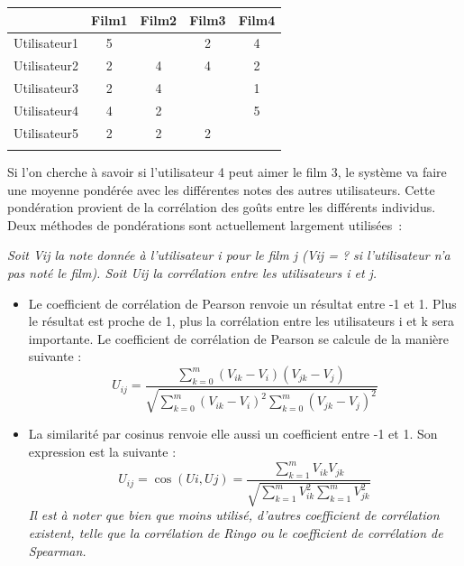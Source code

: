 \documentclass{article}
\begin{document}
\begin{longtable}[c]{lcccc}
     & \multicolumn{1}{l}{Film1} & \multicolumn{1}{l}{Film2} & \multicolumn{1}{l}{Film3} & \multicolumn{1}{l}{Film4} \\ \cline{2-5} 
\endhead
%
\multicolumn{1}{l|}{Utilisateur1} & \multicolumn{1}{c|}{5}    & \multicolumn{1}{c|}{}     & \multicolumn{1}{c|}{2}    & \multicolumn{1}{c|}{4}    \\ \cline{2-5} 
\multicolumn{1}{l|}{Utilisateur2} & \multicolumn{1}{c|}{2}    & \multicolumn{1}{c|}{4}    & \multicolumn{1}{c|}{4}    & \multicolumn{1}{c|}{2}    \\ \cline{2-5} 
\multicolumn{1}{l|}{Utilisateur3} & \multicolumn{1}{c|}{2}    & \multicolumn{1}{c|}{4}    & \multicolumn{1}{c|}{}     & \multicolumn{1}{c|}{1}    \\ \cline{2-5} 
\multicolumn{1}{l|}{Utilisateur4} & \multicolumn{1}{c|}{4}    & \multicolumn{1}{c|}{2}  & \multicolumn{1}{c|}{}     & \multicolumn{1}{c|}{5}    \\ \cline{2-5} 
\multicolumn{1}{l|}{Utilisateur5} & \multicolumn{1}{c|}{2}    & \multicolumn{1}{c|}{2}    & \multicolumn{1}{c|}{2}    & \multicolumn{1}{c|}{}     \\ \cline{2-5} 

\label{my-label3}\\
\end{longtable}

Si l'on cherche à savoir si l'utilisateur 4 peut aimer le film 3, le système va faire une moyenne pondérée avec les différentes notes des autres utilisateurs. Cette pondération provient de la corrélation des goûts entre les différents individus.
Deux méthodes de pondérations sont actuellement largement utilisées~:

\emph{Soit Vij la note donnée à l'utilisateur i pour le film j (Vij = ? si l'utilisateur n'a pas noté le film). Soit Uij la corrélation entre les utilisateurs i et j.}
\begin{itemize}
    \item Le coefficient de corrélation de Pearson renvoie un résultat entre -1 et 1. Plus le résultat est proche de 1, plus la corrélation entre les utilisateurs i et k sera importante. Le coefficient de corrélation de Pearson se calcule de la manière suivante :
    \begin{equation}
        U_{ij} = \frac{\sum_{k=0} ^m (V_{ik}-V_{i})(V_{jk}-V_{j})}{\sqrt{\sum_{k=0}^m (V_{ik}-V_{i})^2 \sum_{k=0}^m (V_{jk}-V_{j})^2 }}
    \end{equation}
    
    \item La similarité par cosinus renvoie elle aussi un coefficient entre -1 et 1. Son expression est la suivante :
    \begin{equation}
        U_{ij} = \cos(Ui, Uj)= \frac{\sum_{k=1}^m V_{ik}V_{jk}}{\sqrt{\sum_{k=1}^m V_{ik}^2 \sum_{k=1}^m V_{jk}^2}}
    \end{equation}
    \emph{Il est à noter que bien que moins utilisé, d'autres coefficient de corrélation existent, telle que la corrélation de Ringo ou le coefficient de corrélation de Spearman.}
\end{itemize}
\end{document}
